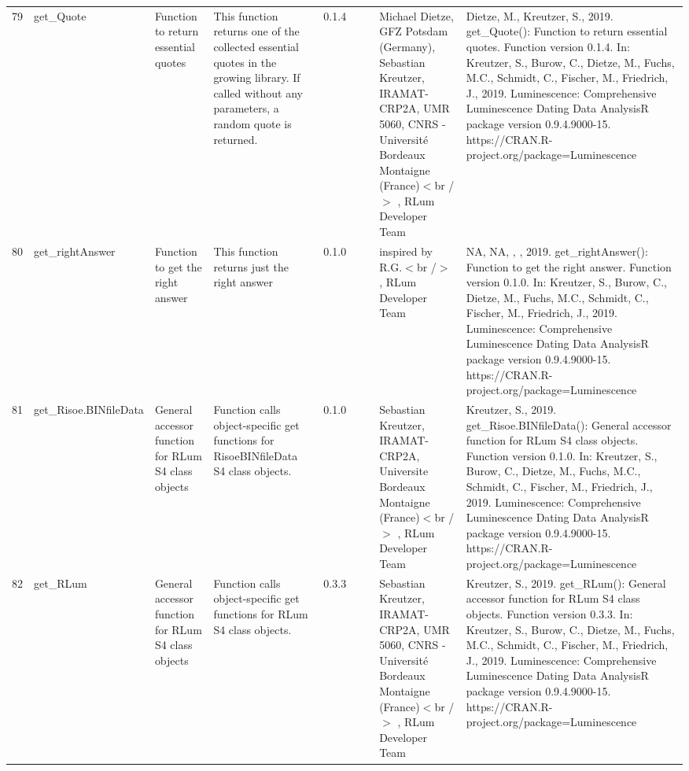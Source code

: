 \begin{table}[ht]
\begin{tabular}{rllllllll}
 \\ 
  79 & get\_Quote & Function to return essential quotes & This function returns one of the collected essential quotes in the growing library. If called without any parameters, a random quote is returned. & 0.1.4
 &  &  & Michael Dietze, GFZ Potsdam (Germany), Sebastian Kreutzer, IRAMAT-CRP2A, UMR 5060, CNRS - Université Bordeaux Montaigne (France)$<$br /$>$ , RLum Developer Team & Dietze, M., Kreutzer, S., 2019. get\_Quote(): Function to return essential quotes. Function version 0.1.4. In: Kreutzer, S., Burow, C., Dietze, M., Fuchs, M.C., Schmidt, C., Fischer, M., Friedrich, J., 2019. Luminescence: Comprehensive Luminescence Dating Data AnalysisR package version 0.9.4.9000-15. https://CRAN.R-project.org/package=Luminescence
 \\ 
  80 & get\_rightAnswer & Function to get the right answer & This function returns just the right answer & 0.1.0
 &  &  & inspired by R.G.$<$br /$>$ , RLum Developer Team & NA, NA, , , 2019. get\_rightAnswer(): Function to get the right answer. Function version 0.1.0. In: Kreutzer, S., Burow, C., Dietze, M., Fuchs, M.C., Schmidt, C., Fischer, M., Friedrich, J., 2019. Luminescence: Comprehensive Luminescence Dating Data AnalysisR package version 0.9.4.9000-15. https://CRAN.R-project.org/package=Luminescence
 \\ 
  81 & get\_Risoe.BINfileData & General accessor function for RLum S4 class objects & Function calls object-specific get functions for RisoeBINfileData S4 class objects. & 0.1.0
 &  &  & Sebastian Kreutzer, IRAMAT-CRP2A, Universite Bordeaux Montaigne (France)$<$br /$>$ , RLum Developer Team & Kreutzer, S., 2019. get\_Risoe.BINfileData(): General accessor function for RLum S4 class objects. Function version 0.1.0. In: Kreutzer, S., Burow, C., Dietze, M., Fuchs, M.C., Schmidt, C., Fischer, M., Friedrich, J., 2019. Luminescence: Comprehensive Luminescence Dating Data AnalysisR package version 0.9.4.9000-15. https://CRAN.R-project.org/package=Luminescence
 \\ 
  82 & get\_RLum & General accessor function for RLum S4 class objects & Function calls object-specific get functions for RLum S4 class objects. & 0.3.3
 &  &  & Sebastian Kreutzer, IRAMAT-CRP2A, UMR 5060, CNRS - Université Bordeaux Montaigne (France)$<$br /$>$ , RLum Developer Team & Kreutzer, S., 2019. get\_RLum(): General accessor function for RLum S4 class objects. Function version 0.3.3. In: Kreutzer, S., Burow, C., Dietze, M., Fuchs, M.C., Schmidt, C., Fischer, M., Friedrich, J., 2019. Luminescence: Comprehensive Luminescence Dating Data AnalysisR package version 0.9.4.9000-15. https://CRAN.R-project.org/package=Luminescence

\end{tabular}
\end{table}
